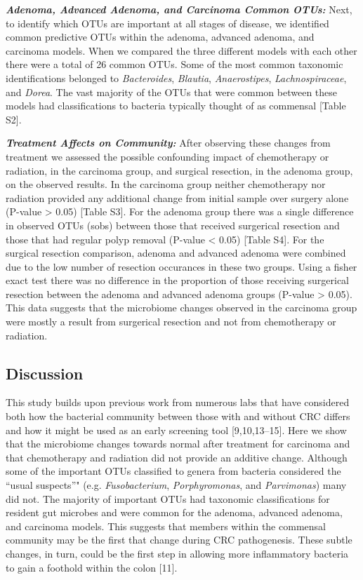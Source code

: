\documentclass[12pt,]{article}
\begin{document}
\textbf{\emph{Adenoma, Advanced Adenoma, and Carcinoma Common OTUs:}}
Next, to identify which OTUs are important at all stages of disease, we
identified common predictive OTUs within the adenoma, advanced adenoma,
and carcinoma models. When we compared the three different models with
each other there were a total of 26 common OTUs. Some of the most common
taxonomic identifications belonged to \emph{Bacteroides},
\emph{Blautia}, \emph{Anaerostipes}, \emph{Lachnospiraceae}, and
\emph{Dorea}. The vast majority of the OTUs that were common between
these models had classifications to bacteria typically thought of as
commensal {[}Table S2{]}.

\textbf{\emph{Treatment Affects on Community:}} After observing these
changes from treatment we assessed the possible confounding impact of
chemotherapy or radiation, in the carcinoma group, and surgical
resection, in the adenoma group, on the observed results. In the
carcinoma group neither chemotherapy nor radiation provided any
additional change from initial sample over surgery alone (P-value
\textgreater{} 0.05) {[}Table S3{]}. For the adenoma group there was a
single difference in observed OTUs (sobs) between those that received
surgerical resection and those that had regular polyp removal (P-value
\textless{} 0.05) {[}Table S4{]}. For the surgical resection comparison,
adenoma and advanced adenoma were combined due to the low number of
resection occurances in these two groups. Using a fisher exact test
there was no difference in the proportion of those receiving surgerical
resection between the adenoma and advanced adenoma groups (P-value
\textgreater{} 0.05). This data suggests that the microbiome changes
observed in the carcinoma group were mostly a result from surgerical
resection and not from chemotherapy or radiation.

\newpage

\subsection{Discussion}\label{discussion}

This study builds upon previous work from numerous labs that have
considered both how the bacterial community between those with and
without CRC differs and how it might be used as an early screening tool
{[}9,10,13--15{]}. Here we show that the microbiome changes towards
normal after treatment for carcinoma and that chemotherapy and radiation
did not provide an additive change. Although some of the important OTUs
classified to genera from bacteria considered the ``usual suspects''"
(e.g. \emph{Fusobacterium}, \emph{Porphyromonas}, and \emph{Parvimonas})
many did not. The majority of important OTUs had taxonomic
classifications for resident gut microbes and were common for the
adenoma, advanced adenoma, and carcinoma models. This suggests that
members within the commensal community may be the first that change
during CRC pathogenesis. These subtle changes, in turn, could be the
first step in allowing more inflammatory bacteria to gain a foothold
within the colon {[}11{]}.
\end{document}
